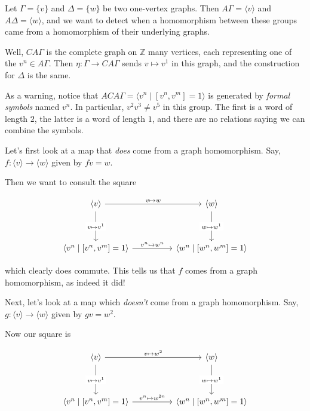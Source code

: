 \documentclass[12pt]{article}
\theoremstyle{definition}
\theoremstyle{theorem}
\begin{document}
Let $\Gamma = \{ v \}$ and $\Delta = \{ w \}$ be two one-vertex graphs.
Then $A \Gamma = \langle v \rangle$ and $A \Delta = \langle w \rangle$,
and we want to detect when a homomorphism between these groups came from a
homomorphism of their underlying graphs.

Well, $CA \Gamma$ is the complete graph on $\mathbb{Z}$ many vertices, each
representing one of the $v^n \in A \Gamma$. 
Then $\eta : \Gamma \to CA \Gamma$ sends $v \mapsto v^1$ in this graph,
and the construction for $\Delta$ is the same.

As a warning, notice that $ACA\Gamma = \langle v^n \mid [v^n, v^m] = 1 \rangle$
is generated by \emph{formal symbols} named $v^n$. In particular,
$v^2 v^3 \neq v^5$ in this group. The first is a word of length $2$, the latter
is a word of length $1$, and there are no relations saying we can combine
the symbols.

\bigskip

Let's first look at a map that \emph{does} come from a graph homomorphism.
Say, $f : \langle v \rangle \to \langle w \rangle$ given by $fv = w$.

Then we want to consult the square

\[\begin{tikzcd}
	{\langle v \rangle} && {\langle w \rangle} \\
	\\
	{\langle v^n \mid [v^n,v^m] = 1 \rangle} && {\langle w^n \mid [w^n, w^m] = 1 \rangle}
	\arrow["{v \mapsto w}", from=1-1, to=1-3]
	\arrow["{v^n \mapsto w^n}", from=3-1, to=3-3]
	\arrow["{v \mapsto v^1}"{description}, from=1-1, to=3-1]
	\arrow["{w \mapsto w^1}"{description}, from=1-3, to=3-3]
\end{tikzcd}\]

which clearly does commute. This tells us that $f$ comes from a graph homomorphism,
as indeed it did!

\bigskip

Next, let's look at a map which \emph{doesn't} come from a graph homomorphism.
Say, $g : \langle v \rangle \to \langle w \rangle$ given by $gv = w^2$.

Now our square is

\[\begin{tikzcd}
	{\langle v \rangle} && {\langle w \rangle} \\
	\\
	{\langle v^n \mid [v^n,v^m] = 1 \rangle} && {\langle w^n \mid [w^n, w^m] = 1 \rangle}
	\arrow["{v \mapsto w^2}", from=1-1, to=1-3]
	\arrow["{v^n \mapsto w^{2n}}", from=3-1, to=3-3]
	\arrow["{v \mapsto v^1}"{description}, from=1-1, to=3-1]
	\arrow["{w \mapsto w^1}"{description}, from=1-3, to=3-3]
\end{tikzcd}\]
\end{document}
